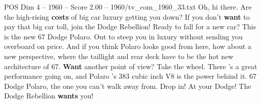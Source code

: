 \begin{textsample}{POS Dim 4 – 1960 – Score 2.00 – 1960/tv\_com\_1960\_33.txt}  \label{ex:f4_pos_007}
Oh, hi there.
Are the high-rising \textbf{costs} of big car luxury getting you down?
If you don't \textbf{want} to pay that big car toll, join the Dodge Rebellion!
Ready to fall for a new car?
This is the new 67 Dodge Polaro.
Out to steep you in luxury without sending you overboard on price.
And if you think Polaro looks good from here, how about a new perspective, where the taillight and rear deck have to be the hot new architecture of 67. \textbf{Want} another point of view?
Take the wheel.
There 's a great performance going on, and Polaro 's 383 cubic inch V8 is the power behind it. 67 Dodge Polaro, the one you can't walk away from.
Drop in!
At your Dodge!
The Dodge Rebellion \textbf{wants} you!

\end{textsample}
